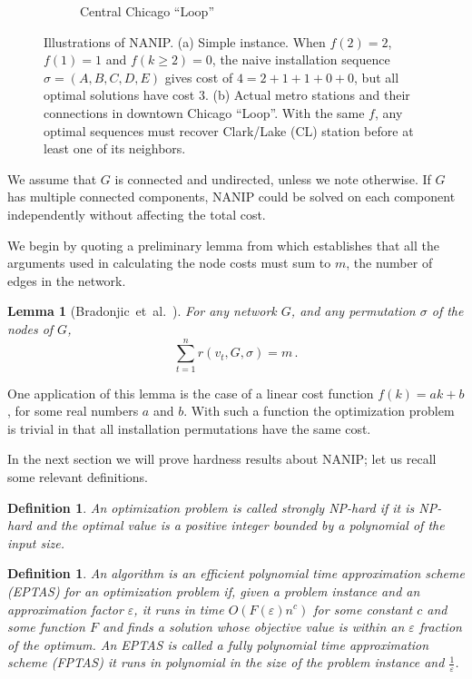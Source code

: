 \documentclass[english]{llncs}
\newtheorem{defn}[thm]{Definition}
\newtheorem{lem}[thm]{Lemma}
\begin{document}
\begin{figure}[th]
\begin{subfigure}[b]{0.6\textwidth}
\caption{Central Chicago ``Loop''}
\end{subfigure}
\caption{Illustrations of NANIP.
(a) Simple instance.  
When $f(2)=2$, $f(1)=1$ and $f(k\geq2)=0$, the naive installation sequence $\sigma=(A,B,C,D,E)$
gives cost of $4=2+1+1+0+0$, but all optimal solutions have cost $3$.\label{fig:illustration}
(b) Actual metro stations and their connections in downtown Chicago ``Loop''.  
With the same $f$, any optimal sequences must recover Clark/Lake (CL) station before at least one of its neighbors.}
\end{figure}

We assume that $G$ is connected and undirected, unless we note otherwise. If
$G$ has multiple connected components, NANIP could be solved on each component
independently without affecting the total cost.

We begin by quoting a preliminary lemma from \cite{Gutfraind14} which
establishes that all the arguments used in calculating the node costs must sum
to $m$, the number of edges in the network.

\begin{lem}[Bradonjic~et~al.~\cite{Gutfraind14}]
\label{lem:edge-decomp}
For any network $G$, and any permutation $\sigma$ of the nodes of $G$, 
\begin{equation}
\sum_{t=1}^n r(v_t,G,\sigma) = m \label{eq:edge-decomp}\,.
\end{equation}
\end{lem}

One application of this lemma is the case of a linear cost function
$f(k)=ak+b$, for some real numbers $a$ and $b$.  With such a function the
optimization problem is trivial in that all installation permutations have the
same cost.

In the next section we will prove hardness results about NANIP; let us recall
some relevant definitions.

\begin{defn}

An optimization problem is called \emph{strongly NP-hard} if it is NP-hard and
the optimal value is a positive integer bounded by a polynomial of the input
size.

\end{defn}


\begin{defn}

An algorithm is an \emph{efficient polynomial time approximation scheme
(EPTAS)} for an optimization problem if, given a problem instance and an
approximation factor $\varepsilon$, it runs in time $O(F(\varepsilon) n^c)$
for some constant $c$ and some function $F$ and finds a solution whose
objective value is within an $\varepsilon$ fraction of the optimum. An EPTAS is
called a \emph{fully polynomial time approximation scheme (FPTAS)} it runs in
polynomial in the size of the problem instance and $\frac{1}{\varepsilon}$.  

\end{defn}
\end{document}
